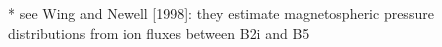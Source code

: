 * see Wing and Newell [1998]: they estimate magnetospheric pressure
distributions from ion fluxes between B2i and B5

